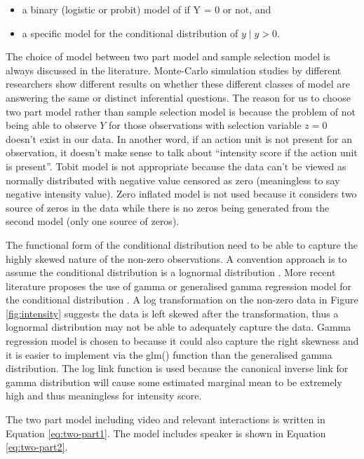 \documentclass{monashthesis}
\begin{document}
\begin{itemize}
\tightlist
\item
  a binary (logistic or probit) model of if Y = 0 or not, and
\item
  a specific model for the conditional distribution of \(y \mid y > 0\).
\end{itemize}

The choice of model between two part model and sample selection model is always discussed in the literature. Monte-Carlo simulation studies by different researchers \autocites{leung1996choice}{duan1984choosing}{manning1987monte} show different results on whether these different classes of model are answering the same or distinct inferential questions. The reason for us to choose two part model rather than sample selection model is because the problem of not being able to observe \(Y\) for those observations with selection variable \(z = 0\) doesn't exist in our data. In another word, if an action unit is not present for an observation, it doesn't make sense to talk about ``intensity score if the action unit is present''. Tobit model is not appropriate because the data can't be viewed as normally distributed with negative value censored as zero (meaningless to say negative intensity value). Zero inflated model is not used because it considers two source of zeros in the data while there is no zeros being generated from the second model (only one source of zeros).

The functional form of the conditional distribution need to be able to capture the highly skewed nature of the non-zero observations. A convention approach is to assume the conditional distribution is a lognormal distribution \autocites{manning1981two}{diehr1999methods}. More recent literature proposes the use of gamma or generalised gamma regression model for the conditional distribution \autocite{twopart2010}. A log transformation on the non-zero data in Figure \ref{fig:intensity} suggests the data is left skewed after the transformation, thus a lognormal distribution may not be able to adequately capture the data. Gamma regression model is chosen to because it could also capture the right skewness and it is easier to implement via the glm() function than the generalised gamma distribution. The log link function is used because the canonical inverse link for gamma distribution will cause some estimated marginal mean to be extremely high and thus meaningless for intensity score.

The two part model including video and relevant interactions is written in Equation \ref{eq:two-part1}. The model includes speaker is shown in Equation \ref{eq:two-part2}.
\end{document}
